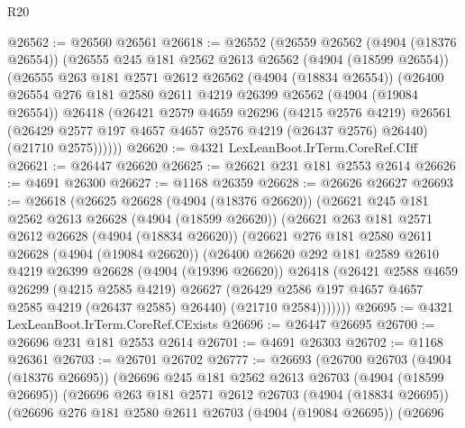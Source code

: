 \begin{lexlean}{R20}
\begin{coremodule}
@26562 := @26560 @26561
@26618 := @26552
    (@26559
      @26562
      (@4904 (@18376 @26554))
      (@26555
        @245
        @181
        @2562
        @2613
        @26562
        (@4904 (@18599 @26554))
        (@26555
          @263
          @181
          @2571
          @2612
          @26562
          (@4904 (@18834 @26554))
          (@26400
            @26554
            @276
            @181
            @2580
            @2611
            @4219
            @26399
            @26562
            (@4904 (@19084 @26554))
            @26418
            (@26421
              @2579
              @4659
              @26296
              (@4215 @2576 @4219)
              @26561
              (@26429 @2577 @197 @4657 @4657 @2576 @4219 (@26437 @2576) @26440)
              (@21710 @2575))))))
@26620 := @4321 LexLeanBoot.IrTerm.CoreRef.CIff
@26621 := @26447 @26620
@26625 := @26621 @231 @181 @2553 @2614
@26626 := @4691 @26300
@26627 := @1168 @26359
@26628 := @26626 @26627
@26693 := @26618
    (@26625
      @26628
      (@4904 (@18376 @26620))
      (@26621
        @245
        @181
        @2562
        @2613
        @26628
        (@4904 (@18599 @26620))
        (@26621
          @263
          @181
          @2571
          @2612
          @26628
          (@4904 (@18834 @26620))
          (@26621
            @276
            @181
            @2580
            @2611
            @26628
            (@4904 (@19084 @26620))
            (@26400
              @26620
              @292
              @181
              @2589
              @2610
              @4219
              @26399
              @26628
              (@4904 (@19396 @26620))
              @26418
              (@26421
                @2588
                @4659
                @26299
                (@4215 @2585 @4219)
                @26627
                (@26429 @2586 @197 @4657 @4657 @2585 @4219 (@26437 @2585) @26440)
                (@21710 @2584)))))))
@26695 := @4321 LexLeanBoot.IrTerm.CoreRef.CExists
@26696 := @26447 @26695
@26700 := @26696 @231 @181 @2553 @2614
@26701 := @4691 @26303
@26702 := @1168 @26361
@26703 := @26701 @26702
@26777 := @26693
    (@26700
      @26703
      (@4904 (@18376 @26695))
      (@26696
        @245
        @181
        @2562
        @2613
        @26703
        (@4904 (@18599 @26695))
        (@26696
          @263
          @181
          @2571
          @2612
          @26703
          (@4904 (@18834 @26695))
          (@26696
            @276
            @181
            @2580
            @2611
            @26703
            (@4904 (@19084 @26695))
            (@26696

\end{coremodule}
\end{lexlean}
